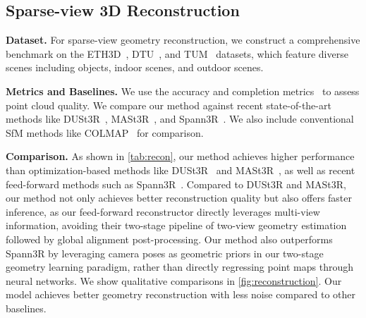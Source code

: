 \subsection{Sparse-view 3D Reconstruction}
\noindent\textbf{Dataset.}
For sparse-view geometry reconstruction, we construct a comprehensive benchmark on the ETH3D~\cite{schops2017multi}, DTU~\cite{jensen2014large}, and TUM~\cite{sturm12iros_ws} datasets, which feature diverse scenes including objects, indoor scenes, and outdoor scenes.
%

\noindent\textbf{Metrics and Baselines.}
We use the accuracy and completion metrics~\cite{jensen2014large} to assess point cloud quality. We compare our method against recent state-of-the-art methods like DUSt3R~\cite{wang2024dust3r}, MASt3R~\cite{leroy2024grounding}, and Spann3R~\cite{wang2024spann3r}.
%
We also include conventional SfM methods like COLMAP~\cite{schoenberger2016sfm} for comparison.



\noindent\textbf{Comparison.}
As shown in \cref{tab:recon}, our method achieves higher performance than optimization-based methods like DUSt3R~\cite{wang2024dust3r} and MASt3R~\cite{leroy2024grounding}, as well as recent feed-forward methods such as Spann3R~\cite{wang2024spann3r}.
%
Compared to DUSt3R and MASt3R, our method not only achieves better reconstruction quality but also offers faster inference, as our feed-forward reconstructor directly leverages multi-view information, avoiding their two-stage pipeline of two-view geometry estimation followed by global alignment post-processing.
%
Our method also outperforms Spann3R by leveraging camera poses as geometric priors in our two-stage geometry learning paradigm, rather than directly regressing point maps through neural networks.
%
We show qualitative comparisons in \cref{fig:reconstruction}. Our model achieves better geometry reconstruction with less noise compared to other baselines.



